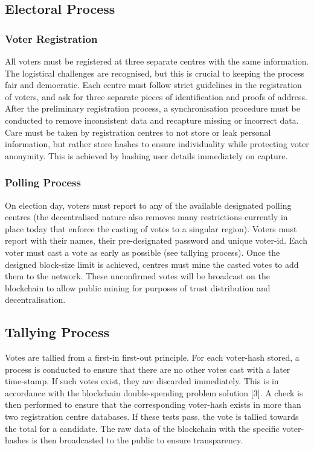 \documentclass{article}
\begin{document}
    \subsection{Electoral Process}
    \subsubsection{Voter Registration}
    All voters must be registered at three separate centres with the same information. The logistical challenges are recognised, but this is crucial to keeping the process fair and democratic. Each centre must follow strict guidelines in the registration of voters, and ask for three separate pieces of identification and proofs of address. After the preliminary registration process, a synchronisation procedure must be conducted to remove inconsistent data and recapture missing or incorrect data. Care must be taken by registration centres to not store or leak personal information, but rather store hashes to ensure individuality while protecting voter anonymity. This is achieved by hashing user details immediately on capture.
    \subsubsection{Polling Process}
    On election day, voters must report to any of the available designated polling centres (the decentralised nature also removes many restrictions currently in place today that enforce the casting of votes to a singular region). Voters must report with their names, their pre-designated password and unique voter-id. Each voter must cast a vote as early as possible (see tallying process). Once the designed block-size limit is achieved, centres must mine the casted votes to add them to the network. These unconfirmed votes will be broadcast on the blockchain to allow public mining for purposes of trust distribution and decentralisation.
    \subsection{Tallying Process}
    Votes are tallied from a first-in first-out principle. For each voter-hash stored, a process is conducted to ensure that there are no other votes cast with a later time-stamp. If such votes exist, they are discarded immediately. This is in accordance with the blockchain double-spending problem solution [3]. A check is then performed to ensure that the corresponding voter-hash exists in more than two registration centre databases. If these tests pass, the vote is tallied towards the total for a candidate.
    The raw data of the blockchain with the specific voter-hashes is then broadcasted to the public to ensure transparency.
\end{document}
